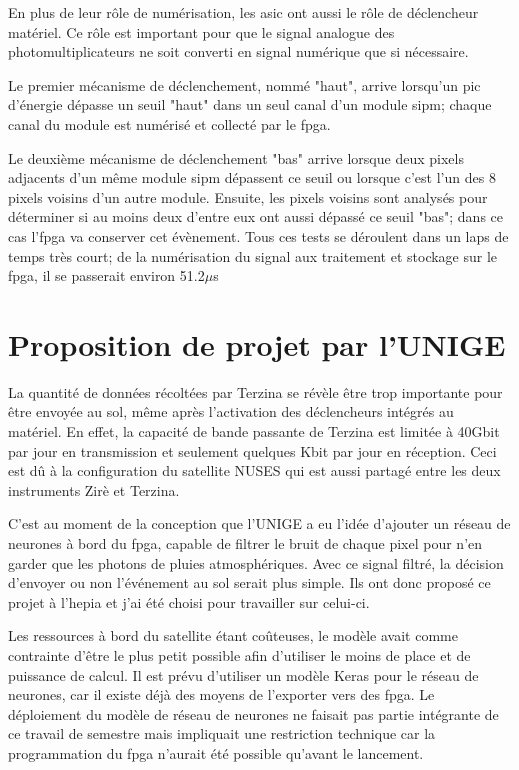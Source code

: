 En plus de leur rôle de numérisation, les \gls{asic} ont aussi le rôle de déclencheur matériel. 
Ce rôle est important pour que le signal analogue des photomultiplicateurs ne soit converti en signal numérique que si nécessaire. 

Le premier mécanisme de déclenchement, nommé "haut", arrive lorsqu'un pic d'énergie dépasse un seuil "haut" dans un seul canal
d'un module \gls{sipm}; chaque canal du module est numérisé et collecté par le \gls{fpga}. 

Le deuxième mécanisme de déclenchement "bas" arrive lorsque deux pixels adjacents d'un même module \gls{sipm}
dépassent ce seuil ou lorsque c'est l'un des 8 pixels voisins d'un autre module. 
Ensuite, les pixels voisins sont analysés pour déterminer si au moins deux d'entre eux ont aussi dépassé ce seuil "bas"; dans ce cas l'\gls{fpga} va conserver cet évènement.
Tous ces tests se déroulent dans un laps de temps très court; de la numérisation du signal aux traitement et stockage sur le \gls{fpga}, il se passerait environ 51.2$\mu$s

\section{Proposition de projet par l'UNIGE}

La quantité de données récoltées par Terzina se révèle être trop importante pour être envoyée au sol, même après l'activation des déclencheurs intégrés au matériel.
En effet, la capacité de bande passante de Terzina est limitée à 40Gbit par jour en transmission et seulement quelques Kbit par jour en réception.
Ceci est dû à la configuration du satellite NUSES qui est aussi partagé entre les deux instruments Zirè et Terzina.

C'est au moment de la conception que l'UNIGE a eu l'idée d'ajouter un réseau de neurones à bord du \gls{fpga}, capable de filtrer
le bruit de chaque pixel pour n'en garder que les photons de pluies atmosphériques. 
Avec ce signal filtré, la décision d'envoyer ou non l'événement au sol serait plus simple. 
Ils ont donc proposé ce projet à l'\gls{hepia} et j'ai été choisi pour travailler sur celui-ci.

Les ressources à bord du satellite étant coûteuses, le modèle avait comme contrainte d'être le plus petit possible 
afin d'utiliser le moins de place et de puissance de calcul.
Il est prévu d'utiliser un modèle Keras pour le réseau de neurones, car il existe déjà des moyens de l'exporter vers des \gls{fpga}.
Le déploiement du modèle de réseau de neurones ne faisait pas partie intégrante de ce travail de semestre mais impliquait une
restriction technique car la programmation du \gls{fpga} n'aurait été possible qu'avant le lancement.

